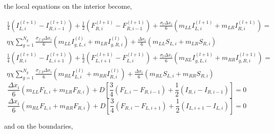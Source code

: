 \documentclass{template}
\begin{document}
the local equations on the interior become,

\begin{multline}
    \frac{1}{4} \left(I_{L, i}^{(l+1)} - I_{R, i-1}^{(l+1)} \right) + \frac{1}{2}\left(F_{R, i}^{(l+1)} - F_{R, i-1}^{(l+1)} \right) + \frac{\sigma_t \Delta x_i}{6} \left( m_{LL} I_{L, i}^{(l+1)} + m_{LR}I_{R, i}^{(l+1)}\right) =\\
    \eta \chi \sum_{g=1}^{N_g} \frac{\sigma_{f, g} \Delta x_i}{6} \left(m_{LL} I_{g, L, i}^{(l)} + m_{LR} I_{g, R, i}^{(l)} \right) + \frac{\Delta x_i}{6} \left(m_{LL}S_{L, i} + m_{LR}S_{R, i} \right)
\end{multline}
\begin{multline}
    \frac{1}{4} \left(I_{R, i}^{(l+1)} - I_{L, i+1}^{(l+1)} \right) + \frac{1}{2}\left(F_{L, i+1}^{(l+1)} - F_{L, i}^{(l+1)} \right) + \frac{\sigma_t \Delta x_i}{6} \left( m_{RL} I_{g, L, i}^{(l+1)} + m_{RR}I_{g, R, i}^{(l+1)}\right) =\\
    \eta \chi \sum_{g=1}^{N_g} \frac{\sigma_{f, g} \Delta x_i}{6} \left(m_{RL} I_{L, i}^{(l)} + m_{RR} I_{R, i}^{(l)} \right) + \frac{\Delta x_i}{6} \left(m_{RL}S_{L, i} + m_{RR}S_{R, i} \right)
\end{multline}
\begin{equation}
    \frac{\Delta x_i}{6}\left( m_{LL} F_{L, i} + m_{LR}F_{R, i} \right) + D \left[ \frac{3}{4}\left(F_{L, i} - F_{R, i-1} \right)  + \frac{1}{2}\left(I_{R, i} - I_{R, i-1} \right) \right] = 0
\end{equation}
\begin{equation}
    \frac{\Delta x_i}{6}\left( m_{RL} F_{L, i} + m_{RR}F_{R, i} \right) + D \left[ \frac{3}{4}\left(F_{R, i} - F_{L, i+1} \right)  + \frac{1}{2}\left(I_{L, i+1} - I_{L, i} \right) \right] = 0
\end{equation}


and on the boundaries,
\end{document}
